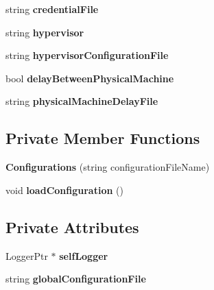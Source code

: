 \begin{DoxyCompactItemize}
\item 
\hypertarget{classConfigurations_a7488c9df099b747f9ae8b3a9962a63a3}{string {\bfseries credential\-File}}\label{classConfigurations_a7488c9df099b747f9ae8b3a9962a63a3}

\item 
\hypertarget{classConfigurations_a2937824aae442cb24b1524f8fd8c8d8e}{string {\bfseries hypervisor}}\label{classConfigurations_a2937824aae442cb24b1524f8fd8c8d8e}

\item 
\hypertarget{classConfigurations_a3ca941f8b27e5f55a4bccfbeff4bcd9b}{string {\bfseries hypervisor\-Configuration\-File}}\label{classConfigurations_a3ca941f8b27e5f55a4bccfbeff4bcd9b}

\item 
\hypertarget{classConfigurations_ace0375a4beb87f5fb09d9973f8e3267a}{bool {\bfseries delay\-Between\-Physical\-Machine}}\label{classConfigurations_ace0375a4beb87f5fb09d9973f8e3267a}

\item 
\hypertarget{classConfigurations_a5316194cce911829e05098db74e33e6c}{string {\bfseries physical\-Machine\-Delay\-File}}\label{classConfigurations_a5316194cce911829e05098db74e33e6c}

\end{DoxyCompactItemize}
\subsection*{\-Private \-Member \-Functions}
\begin{DoxyCompactItemize}
\item 
\hypertarget{classConfigurations_a2243b4ffe09fdfa64acb39d1bc37027b}{{\bfseries \-Configurations} (string configuration\-File\-Name)}\label{classConfigurations_a2243b4ffe09fdfa64acb39d1bc37027b}

\item 
\hypertarget{classConfigurations_a93ab9f99df3f5d03d91ff1c523216211}{void {\bfseries load\-Configuration} ()}\label{classConfigurations_a93ab9f99df3f5d03d91ff1c523216211}

\end{DoxyCompactItemize}
\subsection*{\-Private \-Attributes}
\begin{DoxyCompactItemize}
\item 
\hypertarget{classConfigurations_a6f7266b476d1f1b8bbee37d8bafd954e}{\-Logger\-Ptr $\ast$ {\bfseries self\-Logger}}\label{classConfigurations_a6f7266b476d1f1b8bbee37d8bafd954e}

\item 
\hypertarget{classConfigurations_ac1deaa706a55c3d0b854e673d5d9a474}{string {\bfseries global\-Configuration\-File}}\label{classConfigurations_ac1deaa706a55c3d0b854e673d5d9a474}

\end{DoxyCompactItemize}
